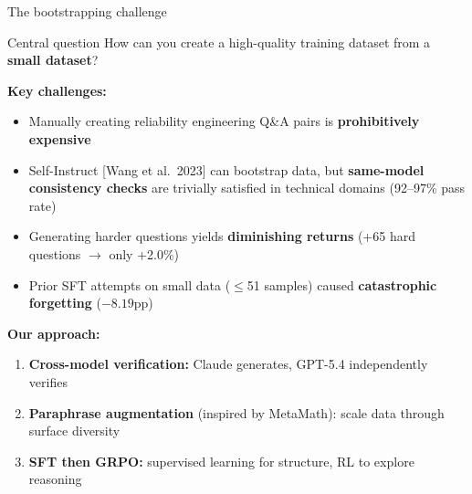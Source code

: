 \documentclass[aspectratio=169,10pt]{beamer}
\begin{document}
\begin{frame}{The bootstrapping challenge}
\begin{block}{Central question}
  How can you create a high-quality training dataset from a \textbf{small dataset}?
\end{block}

\vspace{0.5em}
\textbf{Key challenges:}
\begin{itemize}
  \item Manually creating reliability engineering Q\&A pairs is \textbf{prohibitively expensive}
  \item Self-Instruct [Wang et al.\ 2023] can bootstrap data, but \textbf{same-model consistency checks} are trivially satisfied in technical domains (92--97\% pass rate)
  \item Generating harder questions yields \textbf{diminishing returns} (+65 hard questions $\to$ only +2.0\%)
  \item Prior SFT attempts on small data ($\leq$51 samples) caused \textbf{catastrophic forgetting} ($-8.19$pp)
\end{itemize}

\vspace{0.5em}
\textbf{Our approach:}
\begin{enumerate}
  \item \textbf{Cross-model verification:} Claude generates, GPT-5.4 independently verifies
  \item \textbf{Paraphrase augmentation} (inspired by MetaMath): scale data through surface diversity
  \item \textbf{SFT then GRPO:} supervised learning for structure, RL to explore reasoning
\end{enumerate}
\end{frame}

\end{document}
